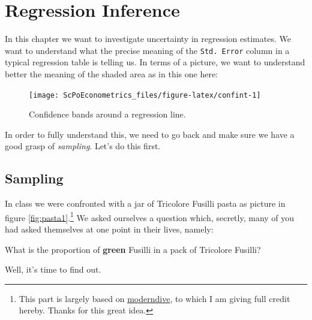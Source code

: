 \documentclass[]{book}
\let\rmarkdownfootnote\footnote%
\def\footnote{\protect\rmarkdownfootnote}
\newenvironment{tip}{\begin{tcolorbox}[colback=green!5!white,colframe=green]}{\end{tcolorbox}}
\begin{document}
\chapter{Regression Inference}\label{std-errors}

In this chapter we want to investigate uncertainty in regression
estimates. We want to understand what the precise meaning of the
\texttt{Std.\ Error} column in a typical regression table is telling us.
In terms of a picture, we want to understand better the meaning of the
shaded area as in this one here:

\begin{figure}

{\centering \texttt{[image: ScPoEconometrics\_files/figure-latex/confint-1]} 

}

\caption{Confidence bands around a regression line.}\label{fig:confint}
\end{figure}

In order to fully understand this, we need to go back and make sure we
have a good grasp of \emph{sampling}. Let's do this first.

\section{Sampling}\label{sampling}

In class we were confronted with a jar of Tricolore Fusilli pasta as
picture in figure \ref{fig:pasta1}.\footnote{This part is largely based
  on \href{https://moderndive.com/7-sampling.html}{moderndive}, to which
  I am giving full credit hereby. Thanks for this great idea.} We asked
ourselves a question which, secretly, many of you had asked themselves
at one point in their lives, namely:

\begin{tip}
What is the proportion of \textbf{green} Fusilli in a pack of Tricolore
Fusilli?
\end{tip}

Well, it's time to find out.
\end{document}
